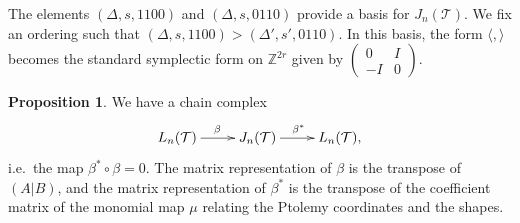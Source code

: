 \documentclass[12pt]{amsart}
\theoremstyle{definition}
\newtheorem{proposition}[theorem]{Proposition}
\newtheorem{remark}[theorem]{Remark}
\numberwithin{equation}{section}
\def\Z{\mathbb{Z}}
\def\T{\mathcal{T}}
\begin{document}

The elements $(\Delta,s,1100)$ and $(\Delta,s,0110)$ provide a basis for $J_n(\T)$. We fix an ordering such that $(\Delta,s,1100)>(\Delta',s',0110)$. In this basis, the form $\langle,\rangle$ becomes the standard symplectic form on $\Z^{2r}$ given by $\left(\begin{smallmatrix}0&I\\-I&0\end{smallmatrix}\right)$.

\begin{proposition}\label{prop:BetaStarBeta}
We have a chain complex
\begin{equation}
\xymatrix{L_n(\T)\ar[r]^\beta& J_n(\T)\ar[r]^{\beta^*}&L_n(\T),}
\end{equation}
i.e.~the map $\beta^*\circ\beta=0$.
The matrix representation of $\beta$ is the transpose of $(A\vert B)$, and the matrix representation of $\beta^*$ is the transpose of the coefficient matrix of the monomial map $\mu$ relating the Ptolemy coordinates and the shapes.
\end{proposition}
\end{document}
